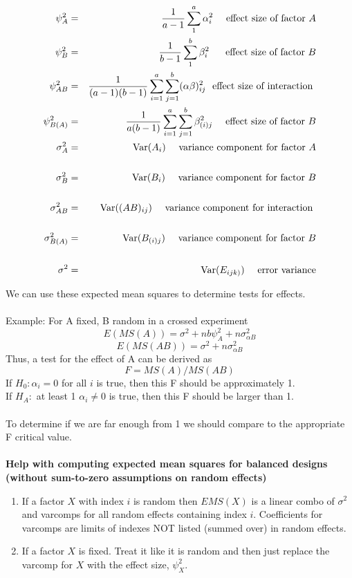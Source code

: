 \begin{eqnarray*}
\psi_A^2 & = & \frac{1}{a-1} \sum_1^a \alpha_i^2 \ \ \ \mbox{ effect size of factor } A\\
\psi_B^2 & = & \frac{1}{b-1} \sum_1^b \beta_i^2 \ \ \ \ \mbox{ effect size of factor } B\\
\psi_{AB}^2 & = & \frac{1}{(a-1)(b-1)} \sum_{i=1}^a\sum_{j=1}^b (\alpha\beta)_{ij}^2 \ \mbox{ effect size of interaction } \\
\psi_{B(A)}^2 & = & \frac{1}{a(b-1)} \sum_{i=1}^a\sum_{j=1}^b \beta_{(i)j}^2 \ \ \ \mbox{ effect size of factor } B\\
\sigma_A^2 & = & \mbox{Var}(A_i) \ \ \ \mbox{ variance component for factor } A\\
\\
\sigma_B^2 & = & \mbox{Var}(B_i) \ \ \ \mbox{ variance component for factor } B\\
\\
\sigma_{AB}^2 & = & \mbox{Var}((AB)_{ij}) \ \ \ \mbox{ variance component for interaction } \\
\\
\sigma_{B(A)}^2 & = & \mbox{Var}(B_{(i)j})\ \ \ \mbox{ variance component for factor }B \\
\\
\sigma^2 & = & \mbox{Var}(E_{ijk)})\ \ \ \mbox{ error variance} 
\end{eqnarray*} 

We can use these expected mean squares to determine tests for effects.\\~\\
Example: For A fixed, B random in a crossed experiment
$$E(MS(A))=\sigma^2 + nb \psi_A^2 + n\sigma_{\alpha B}^2$$
$$E(MS(AB))=\sigma^2 + n\sigma_{\alpha B}^2$$
Thus, a test for the effect of A can be derived as 
$$F=MS(A)/MS(AB)$$
If $H_0: \alpha_i=0$ for all $i$ is true, then this F should be approximately 1. \\
If $H_A:$ at least 1 $\alpha_i\neq 0$ is true, then this F should be larger than 1.\\~\\
To determine if we are far enough from 1 we should compare to the appropriate F critical value.\\~\\

\textbf{Help with computing expected mean squares for balanced designs (without sum-to-zero assumptions on random effects)}
\begin{enumerate}
\item If a factor $X$ with index $i$ is random then $EMS(X)$ is a linear combo of $\sigma^2$ and varcomps for all random effects containing index $i$.  Coefficients for varcomps are limits of indexes NOT listed (summed over) in random effects.
\item If a factor $X$ is fixed.  Treat it like it is random and then just replace the varcomp for $X$ with the effect size, $\psi_X^2$. 
\end{enumerate} 

